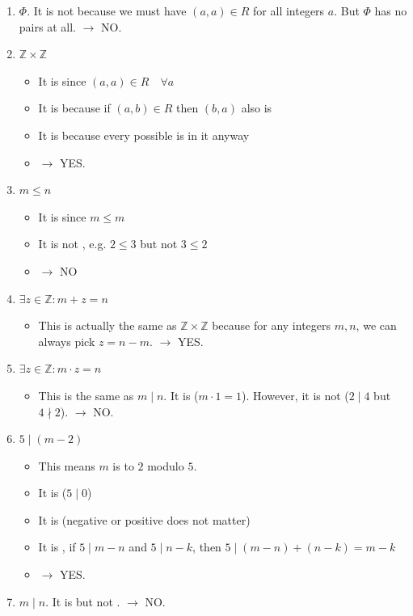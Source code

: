 \begin{enumerate}
\item $\Phi$. It is not  because we must have $(a,a)\in R$ for all integers $a$. But $\Phi$ has no pairs at all. $\to$ NO.
\item $\mathbb{Z} \times \mathbb{Z}$
\begin{itemize}
    \item It is  since $(a,a) \in R \quad \forall a$
    \item It is  because if $(a,b) \in R$ then $(b,a)$ also is
    \item It is  because every possible  is in it anyway
    \item $\to$ YES.
\end{itemize}
\item $m \leq n$
\begin{itemize}
    \item It is  since $m \leq m$
    \item It is not , e.g. $2 \leq 3$ but not $3 \leq 2$
    \item $\to$ NO
\end{itemize}
\item $\exists z \in \mathbb{Z}:m + z = n$
\begin{itemize}
    \item This is actually the same as $\mathbb{Z} \times \mathbb{Z}$ because for any integers $m,n$, we can always pick $z = n-m$. $\to$ YES.
\end{itemize}
\item $\exists z \in \mathbb{Z}:m \cdot z = n$
\begin{itemize}
    \item This is the same as $m \mid n$. It is  ($m \cdot 1 = 1$). However, it is not  ($2 \mid 4$ but $4 \nmid 2$). $\to$ NO.
\end{itemize}
\item $5 \mid (m-2)$
\begin{itemize}
    \item This means $m$ is  to $2$ modulo $5$.
    \item It is  ($5 \mid 0$)
    \item It is  (negative or positive does not matter)
    \item It is , if $5 \mid m-n$ and $5 \mid n-k$, then $5 \mid (m-n) + (n-k) = m-k$
    \item $\to$ YES. 
\end{itemize}
\item $m \mid n$. It is  but not . $\to$ NO.
\end{enumerate}

